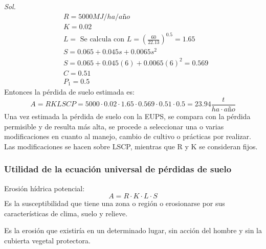     \textit{ Sol. }
    \begin{align*}
        &R= 5000MJ / ha / año\\
        &K = 0.02\\
        &L =\text{ Se calcula con }L=\left(\frac{60}{22.13}\right)^{0.5} = 1.65\\
        &S = 0.065 + 0.045s + 0.0065s^2\\
        &S = 0.065 + 0.045(6) + 0.0065(6)^2 = 0.569\\
        &C = 0.51\\
        &P_1 = 0.5
    \end{align*}
    Entonces la pérdida de suelo estimada es:
    \begin{equation*}
        A = RKLSCP = 5000 \cdot 0.02 \cdot 1.65 \cdot 0.569 \cdot 0.51 \cdot 0.5 = 23.94 \frac{t}{ha\cdot año}
    \end{equation*}
    Una vez estimada la pérdida de suelo con la EUPS, se compara con la pérdida permisible y de resulta más alta, se procede a seleccionar una o varias modificaciones en cuanto al manejo, cambio de cultivo o prácticas por realizar. Las modificaciones se hacen sobre LSCP, mientras que R y K se consideran fijos.
    
    \subsubsection{Utilidad de la ecuación universal de pérdidas de suelo}
    Erosión hídrica potencial:
    \begin{equation}
        A = R \cdot K \cdot L \cdot S
    \end{equation}
    Es la susceptibilidad que tiene una zona o región o erosionarse por sus características de clima, suelo y relieve.
    
    Es la erosión que existiría en un determinado lugar, sin acción del hombre y sin la cubierta vegetal protectora.
    
